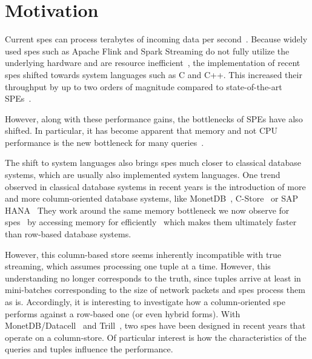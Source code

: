 \section{Motivation}
\label{sec:motivation}

Current \acp{spe} can process terabytes of incoming data per second~\cite[]{alibaba}.
Because widely used \acp{spe} such as Apache Flink and Spark Streaming do not fully utilize the underlying hardware and are resource inefficient~\cite[]{DBLP:conf/icde/ZhangHDZH17,DBLP:journals/pvldb/ZeuchBRMKLRTM19}, the implementation of recent \acp{spe} shifted towards system languages such as C and C++. 
This increased their throughput by up to two orders of magnitude compared to state-of-the-art SPEs~\cite[]{DBLP:journals/pvldb/ZeuchBRMKLRTM19}.

However, along with these performance gains, the bottlenecks of SPEs have also shifted.
In particular, it has become apparent that memory and not CPU performance is the new bottleneck for many queries~\cite[]{bollmeier2021processor}.

The shift to system languages also brings \acp{spe} much closer to classical database systems, which are usually also implemented system languages.
One trend observed in classical database systems in recent years is the introduction of more and more column-oriented database systems, like MonetDB~\cite[]{DBLP:journals/debu/IdreosGNMMK12,DBLP:conf/cidr/BonczZN05,DBLP:journals/vldb/BonczK99}, C-Store~\cite[]{DBLP:conf/vldb/StonebrakerABCCFLLMOORTZ05} or SAP HANA~\cite[]{DBLP:conf/sigmod/SikkaFLCPB12}
They work around the same memory bottleneck we now observe for \acp{spe}~\cite[]{DBLP:conf/vldb/BonczMK99} by accessing memory for efficiently~\cite[]{DBLP:conf/sigmod/AbadiMH08} which makes them ultimately faster than row-based database systems.

However, this column-based store seems inherently incompatible with true streaming, which assumes processing one tuple at a time.
However, this understanding no longer corresponds to the truth, since tuples arrive at least in mini-batches corresponding to the size of network packets and \acp{spe} process them as is.
Accordingly, it is interesting to investigate how a column-oriented \ac{spe} performs against a row-based one (or even hybrid forms).
With MonetDB/Datacell~\cite[]{DBLP:journals/pvldb/LiarouIMK12} and Trill~\cite[]{DBLP:journals/pvldb/ChandramouliGBDPTW14}, two \acp{spe} have been designed in recent years that operate on a column-store.
Of particular interest is how the characteristics of the queries and tuples influence the performance.